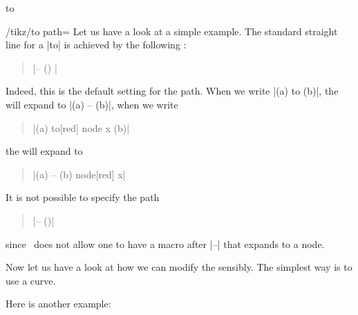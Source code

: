 \begin{pathoperation}{to}{
     }
\begin{key}{/tikz/to path=}
    Let us have a look at a simple example. The standard straight line
    for a |to| is achieved by the following :
    \begin{quote}
      |-- (\tikztotarget) \tikztonodes|
    \end{quote}

    Indeed, this is the default setting for the path. When we write
    |(a) to (b)|, the  will expand to |(a) -- (b)|, when
    we write
    \begin{quote}
      |(a) to[red] node {x} (b)|
    \end{quote}
    the  will expand to
    \begin{quote}
      |(a) -- (b) node[red] {x}|
    \end{quote}

    It is not possible to specify the path
    \begin{quote}
      |-- \tikztonodes (\tikztotarget)|
    \end{quote}
    since \tikzname\ does not allow one to have a macro after |--|
    that expands to a node.

    Now let us have a look at how we can modify the 
    sensibly. The simplest way is to use a curve.

\begin{codeexample}[]
\end{codeexample}

    Here is another example:

\begin{codeexample}[]

\end{codeexample}


\end{key}
\end{pathoperation}
